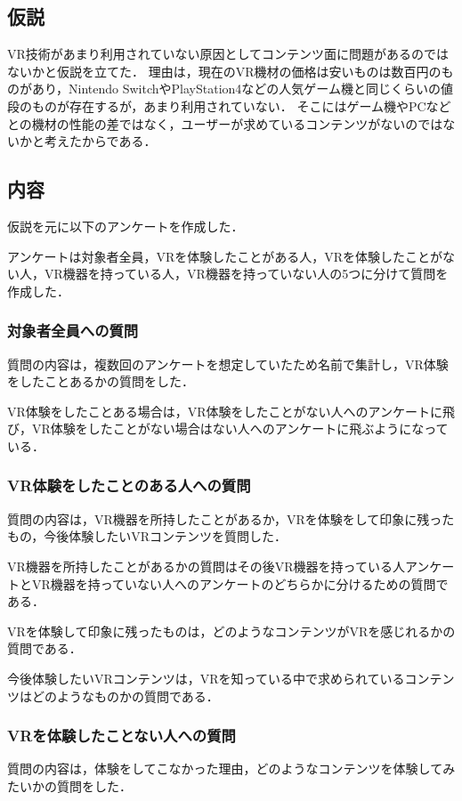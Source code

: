 \documentclass[12pt,a4j]{ltjsarticle}
\begin{document}
\subsection{仮説}
VR技術があまり利用されていない原因としてコンテンツ面に問題があるのではないかと仮説を立てた．
理由は，現在のVR機材の価格は安いものは数百円のものがあり，Nintendo SwitchやPlayStation4などの人気ゲーム機と同じくらいの値段のものが存在するが，あまり利用されていない．
そこにはゲーム機やPCなどとの機材の性能の差ではなく，ユーザーが求めているコンテンツがないのではないかと考えたからである．

\subsection{内容}
仮説を元に以下のアンケートを作成した．

アンケートは対象者全員，VRを体験したことがある人，VRを体験したことがない人，VR機器を持っている人，VR機器を持っていない人の5つに分けて質問を作成した．

\subsubsection{対象者全員への質問}
質問の内容は，複数回のアンケートを想定していたため名前で集計し，VR体験をしたことあるかの質問をした．

VR体験をしたことある場合は，VR体験をしたことがない人へのアンケートに飛び，VR体験をしたことがない場合はない人へのアンケートに飛ぶようになっている．

\subsubsection{VR体験をしたことのある人への質問}
質問の内容は，VR機器を所持したことがあるか，VRを体験をして印象に残ったもの，今後体験したいVRコンテンツを質問した．

VR機器を所持したことがあるかの質問はその後VR機器を持っている人アンケートとVR機器を持っていない人へのアンケートのどちらかに分けるための質問である．

VRを体験して印象に残ったものは，どのようなコンテンツがVRを感じれるかの質問である．

今後体験したいVRコンテンツは，VRを知っている中で求められているコンテンツはどのようなものかの質問である．

\subsubsection{VRを体験したことない人への質問}
質問の内容は，体験をしてこなかった理由，どのようなコンテンツを体験してみたいかの質問をした．
\end{document}
